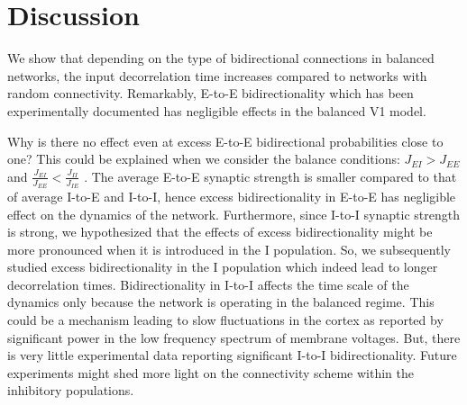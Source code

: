 \section{Discussion}
We show that depending on the type of bidirectional connections in balanced networks, the input decorrelation time increases compared to networks with random connectivity. Remarkably, E-to-E bidirectionality which has been experimentally documented has negligible effects in the balanced V1 model. 



Why is there no effect even at excess E-to-E bidirectional probabilities close to one?  This could be explained when we consider the balance conditions: $J_{EI} > J_{EE}$ and $\frac{J_{EI}}{J_{EE}} < \frac{J_{II}}{J_{IE}}$ \cite{carl1998}. The average E-to-E synaptic strength is smaller compared to that of average I-to-E and I-to-I, hence excess bidirectionality in E-to-E has negligible effect on the dynamics of the network. Furthermore, since I-to-I synaptic strength is strong, we hypothesized that the effects of excess bidirectionality might be more pronounced when it is introduced in the I population. So, we subsequently studied excess bidirectionality in the I population which indeed lead to longer decorrelation times. Bidirectionality in I-to-I affects the time scale of the dynamics only because the network is operating in the balanced regime. This could be a mechanism leading to slow fluctuations in the cortex as reported by significant power in the low frequency spectrum of membrane voltages. But, there is very little experimental data reporting significant I-to-I bidirectionality. Future experiments might shed more light on the connectivity scheme within the inhibitory populations.


